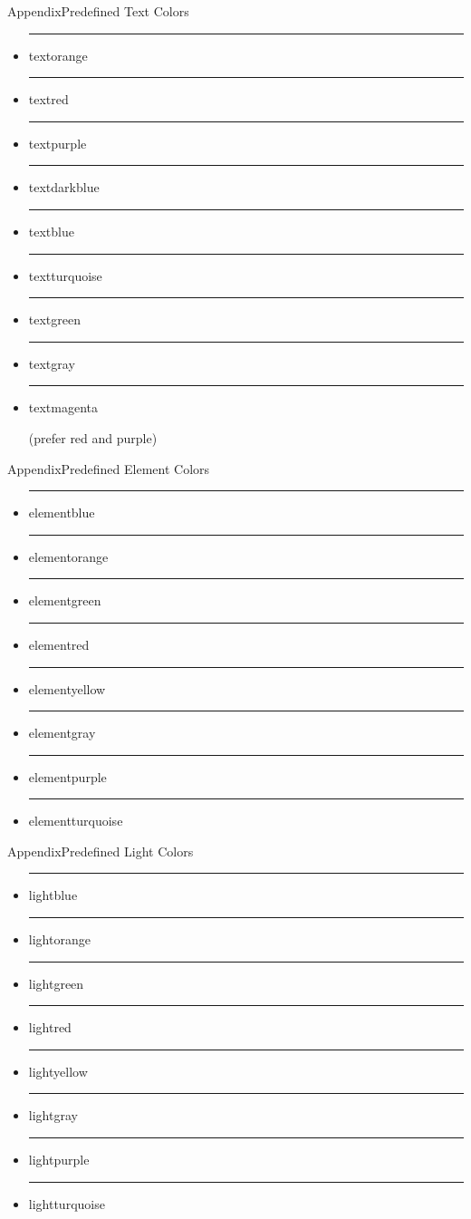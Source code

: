 \documentclass{beamer}
\begin{document}
\begin{frame}{Appendix}{Predefined Text Colors}
	\begin{itemize}
		\item {\color{textorange}\rule{.7cm}{.4cm} textorange}
		\item {\color{textred}\rule{.7cm}{.4cm} textred}
		\item {\color{textpurple}\rule{.7cm}{.4cm} textpurple}
		\item {\color{textdarkblue}\rule{.7cm}{.4cm} textdarkblue}
		\item {\color{textblue}\rule{.7cm}{.4cm} textblue}
		\item {\color{textturquoise}\rule{.7cm}{.4cm} textturquoise}
		\item {\color{textgreen}\rule{.7cm}{.4cm} textgreen}
		\item {\color{textgray}\rule{.7cm}{.4cm} textgray}
		\item {\color{textmagenta}\rule{.7cm}{.4cm} textmagenta} (prefer red and purple)
	\end{itemize}
\end{frame}

\begin{frame}{Appendix}{Predefined Element Colors}
	\begin{itemize}
		\item {\color{elementblue}\rule{.7cm}{.4cm} elementblue}
		\item {\color{elementorange}\rule{.7cm}{.4cm} elementorange}
		\item {\color{elementgreen}\rule{.7cm}{.4cm} elementgreen}
		\item {\color{elementred}\rule{.7cm}{.4cm} elementred}
		\item {\color{elementyellow}\rule{.7cm}{.4cm} elementyellow}
		\item {\color{elementgray}\rule{.7cm}{.4cm} elementgray}
		\item {\color{elementpurple}\rule{.7cm}{.4cm} elementpurple}
		\item {\color{elementturquoise}\rule{.7cm}{.4cm} elementturquoise}
	\end{itemize}
\end{frame}

\begin{frame}{Appendix}{Predefined Light Colors}
	\begin{itemize}
		\item {\color{lightblue}\rule{.7cm}{.4cm} lightblue}
		\item {\color{lightorange}\rule{.7cm}{.4cm} lightorange}
		\item {\color{lightgreen}\rule{.7cm}{.4cm} lightgreen}
		\item {\color{lightred}\rule{.7cm}{.4cm} lightred}
		\item {\color{lightyellow}\rule{.7cm}{.4cm} lightyellow}
		\item {\color{lightgray}\rule{.7cm}{.4cm} lightgray}
		\item {\color{lightpurple}\rule{.7cm}{.4cm} lightpurple}
		\item {\color{lightturquoise}\rule{.7cm}{.4cm} lightturquoise}
	\end{itemize}
\end{frame}
\end{document}
